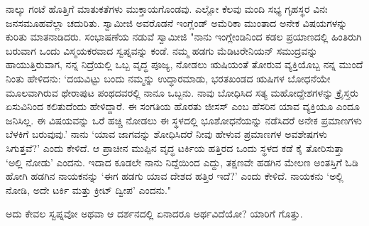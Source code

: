 ನಾಲ್ಕು ಗಂಟೆ ಹೊತ್ತಿಗೆ ಮಾತುಕತೆಗಳು ಮುಕ್ತಾಯಗೊಂಡವು. ಎಲ್ಲೋ ಕೆಲವು ಮಂದಿ ಸಭ್ಯ ಗೃಹಸ್ಥರ ವಿನಃ ಜನಸಮೂಹವೆಲ್ಲಾ ಚದುರಿತು. ಸ್ವಾಮೀಜಿ ಅವರೊಡನೆ ಇಂಗ್ಲೆಂಡ್ ಅಮೆರಿಕಾ ಮುಂತಾದ ಅನೇಕ ವಿಷಯಗಳನ್ನು ಕುರಿತು ಮಾತನಾಡಿದರು. ಸಂಭಾಷಣೆಯ ನಡುವೆ ಸ್ವಾಮೀಜಿ "ನಾನು ಇಂಗ್ಲೇಂಡಿನಿಂದ ಕಡಲ ಪ್ರಯಾಣದಲ್ಲಿ ಹಿಂತಿರುಗಿ ಬರುವಾಗ ಒಂದು ವಿಸ್ಮಯಕರವಾದ ಸ್ವಪ್ನವನ್ನು ಕಂಡೆ. ನಮ್ಮ ಹಡಗು ಮೆಡಿಟರೇನಿಯನ್ ಸಮುದ್ರವನ್ನು ಹಾಯುತ್ತಿರುವಾಗ, ನನ್ನ ನಿದ್ರೆಯಲ್ಲಿ ಒಬ್ಬ ವೃದ್ಧ ಪೂಜ್ಯ, ನೋಡಲು ಋಷಿಯಂತೆ ತೋರುವ ವ್ಯಕ್ತಿಯೊಬ್ಬ ನನ್ನ ಮುಂದೆ ನಿಂತು ಹೇಳಿದನು: ‘ದಯವಿಟ್ಟು ಬಂದು ನಮ್ಮನ್ನು ಉದ್ಧಾರಮಾಡು, ಭರತಖಂಡದ ಋಷಿಗಳ ಬೋಧನೆಯೇ ಮೂಲವಾಗಿರುವ ಥೇರಾಪುಟ ಪಂಥದವರಲ್ಲಿ ನಾನೂ ಒಬ್ಬನು. ನಾವು ಬೋಧಿಸಿದ ಸತ್ಯ ಮಹೋದ್ದೇಶಗಳನ್ನು ಕ್ರೈಸ್ತರು ಏಸುವಿನಿಂದ ಕಲಿತುದೆಂದು ಹೇಳಿದ್ದಾರೆ. ಈ ಸಂಗತಿಯ ಹೊರತು ಜೀಸಸ್ ಎಂಬ ಹೆಸರಿನ ಯಾವ ವ್ಯಕ್ತಿಯೂ ಎಂದೂ ಜನಿಸಿಲ್ಲ. ಈ ವಿಷಯವನ್ನು ಒರೆ ಹಚ್ಚಿ ನೋಡಲು ಈ ಸ್ಥಳದಲ್ಲಿ ಭೂಶೋಧನೆಯನ್ನು ನಡೆಸಿದರೆ ಅನೇಕ ಪ್ರಮಾಣಗಳು ಬೆಳಕಿಗೆ ಬರುವುವು.’ ನಾನು ‘ಯಾವ ಜಾಗವನ್ನು ಶೋಧಿಸಿದರೆ ನೀವು ಹೇಳುವ ಪ್ರಮಾಣಗಳ ಅವಶೇಷಗಳು ಸಿಗುತ್ತವೆ?’ ಎಂದು ಕೇಳಿದೆ. ಆ ಪ್ರಾಚೀನ ಮುಪ್ಪಿನ ವೃದ್ಧ ಟರ್ಕಿಯ ಹತ್ತಿರದ ಒಂದು ಸ್ಥಳದ ಕಡೆ ಕೈ ತೋರಿಸುತ್ತಾ ‘ಅಲ್ಲಿ ನೋಡು’ ಎಂದನು. ಇದಾದ ಕೂಡಲೇ ನಾನು ನಿದ್ದೆಯಿಂದ ಎದ್ದು, ತಕ್ಷಣವೇ ಹಡಗಿನ ಮೇಲಣ ಅಂತಸ್ತಿಗೆ ಓಡಿ ಹೋಗಿ ಹಡಗಿನ ನಾಯಕನನ್ನು ‘ಈಗ ಹಡಗು ಯಾವ ದೇಶದ ಹತ್ತಿರ ಇದೆ?’ ಎಂದು ಕೇಳಿದೆ. ನಾಯಕನು ‘ಅಲ್ಲಿ ನೋಡಿ, ಅದೇ ಟರ್ಕಿ ಮತ್ತು ಕ್ರೀಟ್ ದ್ವೀಪ’ ಎಂದನು."

ಅದು ಕೇವಲ ಸ್ವಪ್ನವೋ ಅಥವಾ ಆ ದರ್ಶನದಲ್ಲಿ ಏನಾದರೂ ಅರ್ಥವಿದೆಯೋ? ಯಾರಿಗೆ ಗೊತ್ತು.

